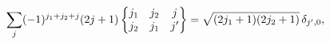 \[\sum_{j}(-1)^{j_{1}+j_{2}+j}(2j+1)\begin{Bmatrix}j_{1}&j_{2}&j\\
j_{2}&j_{1}&j^{\prime}\end{Bmatrix}=\sqrt{(2j_{1}+1)(2j_{2}+1)}\,\delta_{j^{%
\prime},0},\]